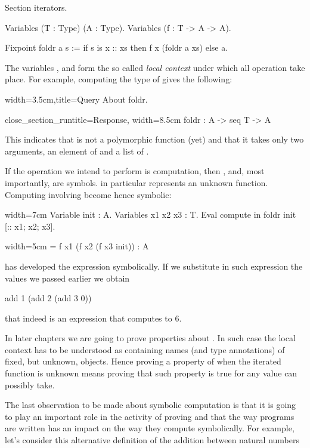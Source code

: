 \begin{coq}{}{}
Section iterators.

Variables (T : Type) (A : Type).
Variables (f : T -> A -> A).

Fixpoint foldr a s :=
  if s is x :: xs then f x (foldr a xs) else a.
\end{coq}

The variables ,  and  form the so called
\emph{local context} under which all operation take place.
For example, computing the type of  gives the following:

\begin{coq}{}{width=3.5cm,title=Query}
About foldr.
\end{coq}
\begin{coqout}{close_section_run}{title=Response, width=8.5cm}
foldr : A -> seq T -> A
\end{coqout}

This indicates that  is not a polymorphic function (yet)
and that it takes only two arguments, an element of  and
a list of .

If the operation we intend to perform is computation, then
,  and, most importantly,  are symbols.
  in particular represents an unknown function.
Computing involving  become hence symbolic:

\begin{coq}{}{width=7cm}
Variable init : A.
Variables x1 x2 x3 : T.
Eval compute in
  foldr init [:: x1; x2; x3].
\end{coq}
\begin{coqout}{}{width=5cm}
= f x1 (f x2 (f x3 init))
: A	
\end{coqout}

\Coq{} has developed the expression symbolically.  If we substitute
in such expression the values we passed earlier we obtain

\begin{coq}{}{}
add 1 (add 2 (add 3 0))
\end{coq}
that indeed is an expression that computes to 6.

In later chapters we are going to prove properties about .
In such case the local context has to be understood as containing
names (and type annotations) of fixed, but unknown, objects.
Hence proving a property of  when the iterated function
 is unknown means proving that such property is true for any
value  can possibly take.

The last observation to be made about symbolic computation is that
it is going to play an important role in the activity of proving
and that the way programs are written has an impact on the way they
compute symbolically.  For example, let's consider this alternative
definition of the addition between natural numbers

